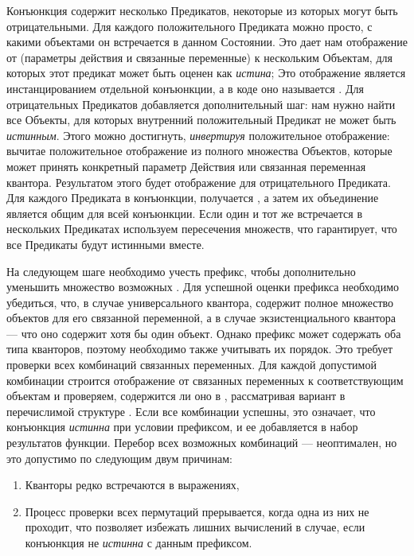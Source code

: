 Конъюнкция содержит несколько Предикатов, некоторые из которых могут быть отрицательными.
Для каждого положительного Предиката можно просто,
с какими объектами он встречается в данном Состоянии.
Это дает нам отображение от  (параметры действия и связанные переменные)
к нескольким Объектам, для которых этот предикат может быть оценен как \textit{истина};
Это отображение является инстанцированием отдельной конъюнкции,
а в коде оно называется .
Для отрицательных Предикатов добавляется дополнительный шаг:
нам нужно найти все Объекты, для которых внутренний положительный Предикат
не может быть \textit{истинным}.
Этого можно достигнуть, \textit{инвертируя} положительное отображение:
вычитае положительное отображение из полного множества Объектов,
которые может принять конкретный параметр Действия или связанная переменная квантора.
Результатом этого будет отображение для отрицательного Предиката.
Для каждого Предиката в конъюнкции, получается , а затем их объединение
является общим  для всей конъюнкции.
Если один и тот же  встречается в нескольких Предикатах
используем пересечения множеств, что гарантирует,
что все Предикаты будут истинными вместе.

На следующем шаге необходимо учесть префикс,
чтобы дополнительно уменьшить множество возможных .
Для успешной оценки префикса необходимо убедиться,
что, в случае универсального квантора,
 содержит полное множество объектов для его связанной переменной,
а в случае экзистенциального квантора --- что оно содержит хотя бы один объект.
Однако префикс может содержать оба типа кванторов,
поэтому необходимо также учитывать их порядок.
Это требует проверки всех комбинаций связанных переменных.
Для каждой допустимой комбинации строится отображение от связанных переменных
к соответствующим объектам и проверяем, содержится ли оно в ,
рассматривая вариант  в перечислимой структуре .
Если все комбинации успешны, это означает,
что конъюнкция \textit{истинна} при условии префиксом,
и ее  добавляется в набор результатов функции.
Перебор всех возможных комбинаций --- неоптимален,
но это допустимо по следующим двум причинам:
\begin{enumerate}
  \item Кванторы редко встречаются в выражениях,
  \item Процесс проверки всех пермутаций прерывается,
    когда одна из них не проходит,
    что позволяет избежать лишних вычислений в случае,
    если конъюнкция не \textit{истинна} с данным префиксом.
\end{enumerate}

